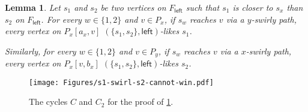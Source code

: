 \documentclass{article}
\newcommand{\leftside}{\mathsf{left}}
\newtheorem{lemma}{Lemma}
\begin{document}
\begin{lemma}\label{lem:s1-swirl-s2-cannot-win}
Let $s_1$ and $s_2$ be two vertices on $F_{\leftside}$ such that $s_1$ is closer to $s_x$ than $s_2$ on $F_{\leftside}$.
For every $w\in \{1,2\}$ and $v\in P_x$, if $s_w$ reaches $v$ via a $y$-swirly path, every vertex on $P_x[a_x,v]$ $(\{s_1,s_2\},\leftside)$-likes $s_1$.

Similarly, for every $w\in \{1,2\}$ and $v\in P_y$, if $s_w$ reaches $v$ via a $x$-swirly path, every vertex on $P_x[v,b_x]$ $(\{s_1,s_2\},\leftside)$-likes $s_2$.

\end{lemma}
\begin{figure}[ht!]
    \centering
    \texttt{[image: Figures/s1-swirl-s2-cannot-win.pdf]}
    \caption{The cycles $C$ and $C_2$ for the proof of \cref{lem:s1-swirl-s2-cannot-win}.}
    \label{fig:s1-swirl-s2-cannot-win}
\end{figure}
\end{document}
